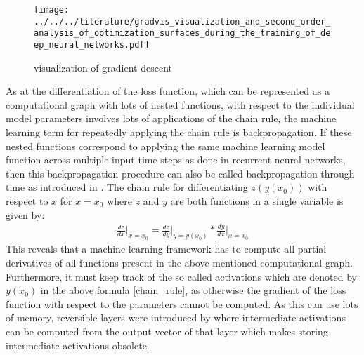 \documentclass[draft,final]{vutinfth} %
\begin{document}
    \begin{figure}[H]
        \centering{}
        \texttt{[image: ../../../literature/gradvis\_visualization\_and\_second\_order\_analysis\_of\_optimization\_surfaces\_during\_the\_training\_of\_deep\_neural\_networks.pdf]}
        \caption{visualization of gradient descent}
        \label{fig:gradient_descent_vis}
    \end{figure}
    As at the differentiation of the loss function, which can be represented as a computational graph with lots of nested functions, with respect to the individual model parameters involves lots of applications of the chain rule, the machine learning term for repeatedly applying the chain rule is backpropagation.
    If these nested functions correspond to applying the same machine learning model function across multiple input time steps as done in recurrent neural networks, then this backpropagation procedure can also be called backpropagation through time as introduced in \cite{GradientDescent}.
    The chain rule for differentiating $z(y(x_0))$ with respect to $x$ for $x=x_0$ where $z$ and $y$ are both functions in a single variable is given by:
    \begin{align}
    \label{chain_rule}
    \frac{dz}{dx} \Bigr\rvert_{x=x_0} = \frac{dz}{dy} \Bigr\rvert_{y=y(x_0)} * \frac{dy}{dx} \Bigr\rvert_{x=x_0}
    \end{align}
    This reveals that a machine learning framework has to compute all partial derivatives of all functions present in the above mentioned computational graph.
    Furthermore, it must keep track of the so called activations which are denoted by $y(x_0)$ in the above formula \ref{chain_rule}, as otherwise the gradient of the loss function with respect to the parameters cannot be computed.
    As this can use lots of memory, reversible layers were introduced by \cite{ReversibleLayer} where intermediate activations can be computed from the output vector of that layer which makes storing intermediate activations obsolete.
\end{document}

